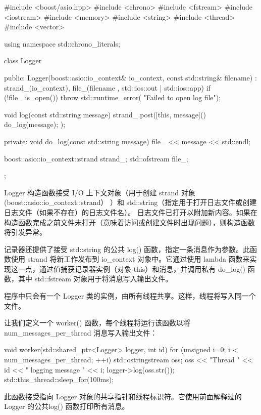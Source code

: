 \begin{cpp}
#include <boost/asio.hpp>
#include <chrono>
#include <fstream>
#include <iostream>
#include <memory>
#include <string>
#include <thread>
#include <vector>

using namespace std::chrono_literals;

class Logger {
    public:
    Logger(boost::asio::io_context& io_context,
            const std::string& filename)
        : strand_(io_context), file_(filename
        , std::ios::out | std::ios::app)
    {
        if (!file_.is_open()) {
            throw std::runtime_error(
            "Failed to open log file");
        }
    }

    void log(const std::string message) {
        strand_.post([this, message](){
            do_log(message);
        });
    }

private:
    void do_log(const std::string message) {
        file_ << message << std::endl;
    }

    boost::asio::io_context::strand strand_;
    std::ofstream file_;
};
\end{cpp}

Logger 构造函数接受 I/O 上下文对象（用于创建 strand 对象 (boost::asio::io\_context::strand） ）和 std::string（指定用于打开日志文件或创建日志文件（如果不存在）的日志文件名）。
日志文件已打开以附加新内容。如果在构造函数完成之前文件未打开（意味着访问或创建文件时出现问题），则构造函数将引发异常。

记录器还提供了接受 std::string 的公共 log() 函数，指定一条消息作为参数。此函数使用 strand 将新工作发布到 io\_context 对象中。它通过使用 lambda 函数来实现这一点，通过值捕获记录器实例（对象 this）和消息，并调用私有 do\_log() 函数，其中 std::fstream 对象用于将消息写入输出文件。

程序中只会有一个 Logger 类的实例，由所有线程共享。这样，线程将写入同一个文件。

让我们定义一个 worker() 函数，每个线程将运行该函数以将 num\_messages\_per\_thread 消息写入输出文件：

\begin{cpp}
void worker(std::shared_ptr<Logger> logger, int id) {
    for (unsigned i=0; i < num_messages_per_thread; ++i) {
        std::ostringstream oss;
        oss << "Thread " << id << " logging message " << i;
        logger->log(oss.str());
        std::this_thread::sleep_for(100ms);
    }
}
\end{cpp}

此函数接受指向 Logger 对象的共享指针和线程标识符。它使用前面解释过的 Logger 的公共log() 函数打印所有消息。

